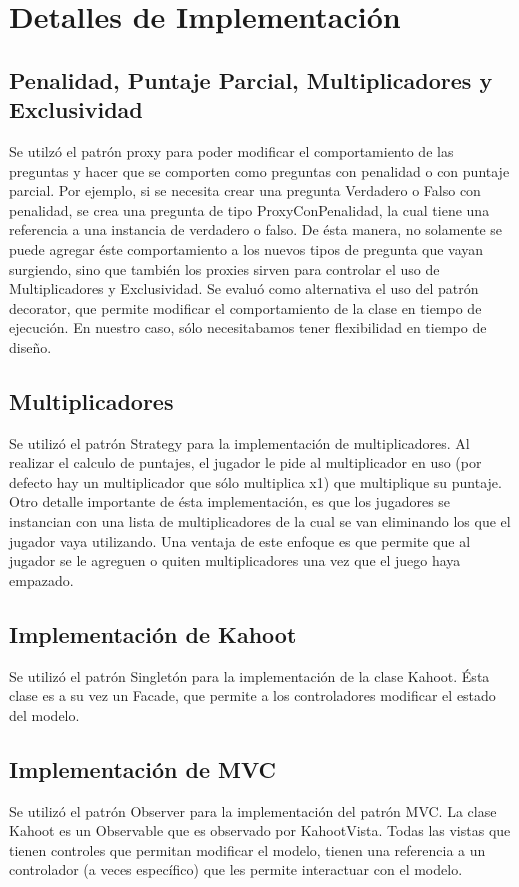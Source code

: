 \documentclass[titlepage,a4paper]{article}
\begin{document}
\section{Detalles de Implementación}\label{sec:detallesdeimplementacion}

\subsection{Penalidad, Puntaje Parcial, Multiplicadores y Exclusividad} Se utilzó el patrón proxy para poder modificar el comportamiento de las preguntas y hacer que se comporten como preguntas con penalidad o con puntaje parcial. Por ejemplo, si se necesita crear una pregunta Verdadero o Falso con penalidad, se crea una pregunta de tipo ProxyConPenalidad, la cual tiene una referencia a una instancia de verdadero o falso. De
ésta manera, no solamente se puede agregar éste comportamiento a los nuevos tipos de pregunta que vayan surgiendo, sino que también los proxies sirven para controlar el uso de Multiplicadores y Exclusividad. Se evaluó como alternativa el uso del patrón decorator, que permite modificar el comportamiento de la clase en tiempo de ejecución. En nuestro caso, sólo necesitabamos tener flexibilidad en tiempo de diseño.

\subsection{Multiplicadores} Se utilizó el patrón Strategy para la implementación de multiplicadores. Al realizar el calculo de puntajes, el jugador le pide al multiplicador en uso (por defecto hay un multiplicador que sólo multiplica x1) que multiplique su puntaje. Otro detalle importante de ésta implementación, es que los jugadores se instancian con una lista de multiplicadores de la cual se van eliminando los que el jugador vaya utilizando. Una ventaja de \’este enfoque es que permite que al jugador se le agreguen o quiten multiplicadores una vez que el juego haya empazado.

\subsection{Implementación de Kahoot} Se utilizó el patrón Singletón para la implementación de la clase Kahoot. Ésta clase es a su vez un Facade, que permite a los controladores modificar el estado del modelo.
\subsection{Implementación de MVC} Se utilizó el patrón Observer para la implementación del patrón MVC. La clase Kahoot es un Observable que es observado por KahootVista. Todas las vistas que tienen controles que permitan modificar el modelo, tienen una referencia a un controlador (a veces específico) que les permite interactuar con el modelo.
\end{document}
